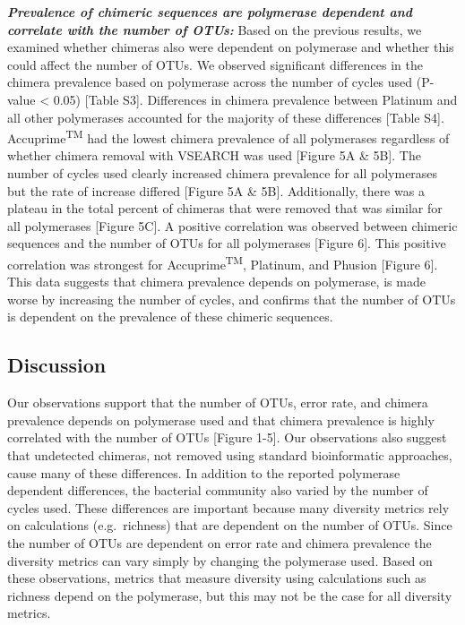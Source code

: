 \documentclass[11pt,]{article}
\begin{document}
\textbf{\emph{Prevalence of chimeric sequences are polymerase dependent
and correlate with the number of OTUs:}} Based on the previous results,
we examined whether chimeras also were dependent on polymerase and
whether this could affect the number of OTUs. We observed significant
differences in the chimera prevalence based on polymerase across the
number of cycles used (P-value \textless{} 0.05) {[}Table S3{]}.
Differences in chimera prevalence between Platinum and all other
polymerases accounted for the majority of these differences {[}Table
S4{]}. Accuprime\textsuperscript{TM} had the lowest chimera prevalence
of all polymerases regardless of whether chimera removal with VSEARCH
was used {[}Figure 5A \& 5B{]}. The number of cycles used clearly
increased chimera prevalence for all polymerases but the rate of
increase differed {[}Figure 5A \& 5B{]}. Additionally, there was a
plateau in the total percent of chimeras that were removed that was
similar for all polymerases {[}Figure 5C{]}. A positive correlation was
observed between chimeric sequences and the number of OTUs for all
polymerases {[}Figure 6{]}. This positive correlation was strongest for
Accuprime\textsuperscript{TM}, Platinum, and Phusion {[}Figure 6{]}.
This data suggests that chimera prevalence depends on polymerase, is
made worse by increasing the number of cycles, and confirms that the
number of OTUs is dependent on the prevalence of these chimeric
sequences.

\newpage

\subsection{Discussion}\label{discussion}

Our observations support that the number of OTUs, error rate, and
chimera prevalence depends on polymerase used and that chimera
prevalence is highly correlated with the number of OTUs {[}Figure
1-5{]}. Our observations also suggest that undetected chimeras, not
removed using standard bioinformatic approaches, cause many of these
differences. In addition to the reported polymerase dependent
differences, the bacterial community also varied by the number of cycles
used. These differences are important because many diversity metrics
rely on calculations (e.g.~richness) that are dependent on the number of
OTUs. Since the number of OTUs are dependent on error rate and chimera
prevalence the diversity metrics can vary simply by changing the
polymerase used. Based on these observations, metrics that measure
diversity using calculations such as richness depend on the polymerase,
but this may not be the case for all diversity metrics.
\end{document}
